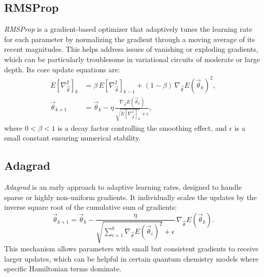 \subsection{RMSProp}
\label{subsec:rmsprop}
\emph{RMSProp} is a gradient-based optimizer that adaptively tunes the learning rate for each parameter by normalizing the gradient through a moving average of its recent magnitudes. This helps address issues of vanishing or exploding gradients, which can be particularly troublesome in variational circuits of moderate or large depth. Its core update equations are:
\[
\begin{aligned}
E[\nabla^2_{\vec{\theta}}]_{k} &= \beta \, E[\nabla^2_{\vec{\theta}}]_{k-1}
+ (1-\beta)\,\nabla_{\vec{\theta}} E(\vec{\theta}_{k})^2,\\
\vec{\theta}_{k+1} &= \vec{\theta}_{k} 
- \eta \, \frac{\nabla_{\vec{\theta}} E(\vec{\theta}_{k})}
{\sqrt{E[\nabla^2_{\vec{\theta}}]_{k}} + \epsilon},
\end{aligned}
\]
where \(0 < \beta < 1\) is a decay factor controlling the smoothing effect, and \(\epsilon\) is a small constant ensuring numerical stability.

\subsection{Adagrad}
\label{subsec:adagrad}
\emph{Adagrad} is an early approach to adaptive learning rates, designed to handle sparse or highly non-uniform gradients. It individually scales the updates by the inverse square root of the cumulative sum of gradients:
\[
\vec{\theta}_{k+1} 
= \vec{\theta}_{k} 
- \frac{\eta}{\sqrt{\sum_{i=1}^{k} 
  \nabla_{\vec{\theta}} E(\vec{\theta}_{i})^2} + \epsilon}
  \,\nabla_{\vec{\theta}} E(\vec{\theta}_{k}).
\]
This mechanism allows parameters with small but consistent gradients to receive larger updates, which can be helpful in certain quantum chemistry models where specific Hamiltonian terms dominate.

